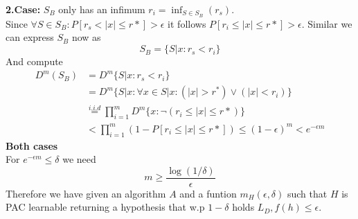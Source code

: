 \documentclass[12pt]{article}
\begin{document}
\textbf{2.Case:} $S_B$ only has an infimum $r_i = \inf_{S \in S_B}(r_s)$.\\
Since $\forall S \in S_B:  P[r_s < |x| \leq r*] > \epsilon$ it follows $P[r_i \leq |x| \leq r*] > \epsilon$. Similar we can express $S_B$ now as 
\begin{equation*}
	S_B = \{S|x: r_s <r_i\}
\end{equation*}
And compute
\begin{align*}
	D^m(S_B) &= D^m \{S|x : r_s < r_i\}\\
	&= D^m \{S|x : \forall x \in S|x: (|x| > r^*) \lor (|x| < r_i)\} \\
	&\overset{i.i.d}{=} \prod_{i=1}^{m} D^m\{x: \neg (r_i \leq |x|\leq r*)\} \\
	&< \prod_{i=1}^{m} (1- P[r_i \leq |x| \leq r*]) \leq (1- \epsilon)^m < e^{-\epsilon m}
\end{align*}
\textbf{Both cases}\\
For $e^{-\epsilon m} \leq \delta$ we need
\begin{equation*}
	m \geq \frac{\log(1/\delta)}{\epsilon}
\end{equation*}
Therefore we have given an algorithm $A$ and a funtion $m_H(\epsilon,\delta)$ such that $H$ is PAC learnable returning a hypothesis that w.p $1-\delta$ holds $L_D,f(h) \leq \epsilon$.
\end{document}
